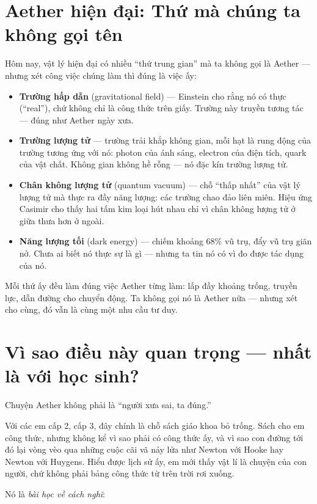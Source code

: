 \section{Aether hiện đại: Thứ mà chúng ta không gọi tên}

Hôm nay, vật lý hiện đại có nhiều “thứ trung gian” mà ta không gọi là Aether — nhưng xét công việc chúng làm thì đúng là việc ấy:

\begin{itemize}
  \item \textbf{Trường hấp dẫn} (gravitational field) — Einstein cho rằng nó có thực (“real”), chứ không chỉ là công thức trên giấy. Trường này truyền tương tác — đúng như Aether ngày xưa.
  \item \textbf{Trường lượng tử} — trường trải khắp không gian, mỗi hạt là rung động của trường tương ứng với nó: photon của ánh sáng, electron của điện tích, quark của vật chất. Không gian không hề rỗng — nó đặc kín trường lượng tử.
  \item \textbf{Chân không lượng tử} (quantum vacuum) — chỗ “thấp nhất” của vật lý lượng tử mà thực ra đầy năng lượng: các trường chao đảo liên miên. Hiệu ứng Casimir cho thấy hai tấm kim loại hút nhau chỉ vì chân không lượng tử ở giữa thưa hơn ở ngoài.
  \item \textbf{Năng lượng tối} (dark energy) — chiếm khoảng 68\% vũ trụ, đẩy vũ trụ giãn nở. Chưa ai biết nó thực sự là gì — nhưng ta tin nó có vì đo được tác dụng của nó.
\end{itemize}

Mỗi thứ ấy đều làm đúng việc Aether từng làm: lấp đầy khoảng trống, truyền lực, dẫn đường cho chuyển động. Ta không gọi nó là Aether nữa — nhưng xét cho cùng, đó vẫn là cùng một nhu cầu tư duy.


\section{Vì sao điều này quan trọng — nhất là với học sinh?}

Chuyện Aether không phải là ``người xưa sai, ta đúng.''

Với các em cấp 2, cấp 3, đây chính là chỗ sách giáo khoa bỏ trống. Sách cho em công thức, nhưng không kể vì sao phải có công thức ấy, và vì sao con đường tới đó lại vòng vèo qua những cuộc cãi vã nảy lửa như Newton với Hooke hay Newton với Huygens. Hiểu được lịch sử ấy, em mới thấy vật lí là chuyện của con người, chứ không phải bảng công thức từ trên trời rơi xuống.

Nó là \emph{bài học về cách nghĩ}:

